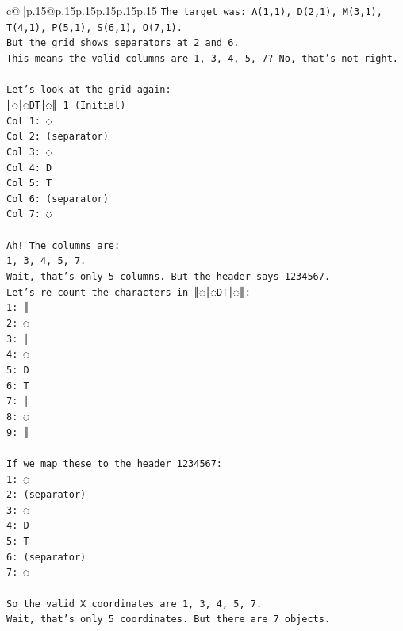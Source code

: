 \documentclass{article}
\begin{document}
{\begin{supertabular}{c@{$\;$}|p{.15\linewidth}@{}p{.15\linewidth}p{.15\linewidth}p{.15\linewidth}p{.15\linewidth}p{.15\linewidth}}
{{{\texttt{The target was: A(1,1), D(2,1), M(3,1), T(4,1), P(5,1), S(6,1), O(7,1).} \\
\texttt{But the grid shows separators at 2 and 6.} \\
\texttt{This means the valid columns are 1, 3, 4, 5, 7? No, that's not right.} \\
\\ 
\texttt{Let's look at the grid again:} \\
\texttt{║◌│◌DT│◌║ 1 (Initial)} \\
\texttt{Col 1: ◌} \\
\texttt{Col 2: (separator)} \\
\texttt{Col 3: ◌} \\
\texttt{Col 4: D} \\
\texttt{Col 5: T} \\
\texttt{Col 6: (separator)} \\
\texttt{Col 7: ◌} \\
\\ 
\texttt{Ah! The columns are:} \\
\texttt{1, 3, 4, 5, 7.} \\
\texttt{Wait, that's only 5 columns. But the header says 1234567.} \\
\texttt{Let's re{-}count the characters in ║◌│◌DT│◌║:} \\
\texttt{1: ║} \\
\texttt{2: ◌} \\
\texttt{3: │} \\
\texttt{4: ◌} \\
\texttt{5: D} \\
\texttt{6: T} \\
\texttt{7: │} \\
\texttt{8: ◌} \\
\texttt{9: ║} \\
\\ 
\texttt{If we map these to the header 1234567:} \\
\texttt{1: ◌} \\
\texttt{2: (separator)} \\
\texttt{3: ◌} \\
\texttt{4: D} \\
\texttt{5: T} \\
\texttt{6: (separator)} \\
\texttt{7: ◌} \\
\\ 
\texttt{So the valid X coordinates are 1, 3, 4, 5, 7.} \\
\texttt{Wait, that's only 5 coordinates. But there are 7 objects.} \\
}}}
\end{supertabular}}
\end{document}
